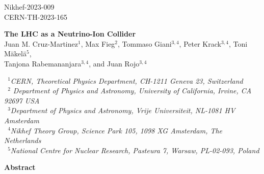 \documentclass[11pt,a4paper]{article}
\numberwithin{equation}{section}
\numberwithin{figure}{section}
\numberwithin{table}{section}
\begin{document}

\vspace{-2.0cm}
\begin{flushright}
Nikhef-2023-009 \\ CERN-TH-2023-165\\
\end{flushright}
\vspace{0.6cm}

\begin{center}
  {\Large \bf The LHC as a Neutrino-Ion Collider}\\
  \vspace{1.1cm}
  {\small
    Juan M. Cruz-Martinez$^{1}$, Max Fieg$^{2}$, Tommaso Giani$^{3,4}$, Peter Krack$^{3,4}$, Toni M\"akel\"a$^{5}$,  \\[0.1cm]
    Tanjona Rabemananjara$^{3,4}$, and Juan Rojo$^{3,4}$
  }\\
  
\vspace{0.7cm}

{\it \small
    ~$^1$CERN, Theoretical Physics Department, CH-1211 Geneva 23, Switzerland \\[0.1cm]
    ~$^2$ Department of Physics and Astronomy, University of California, Irvine, CA 92697 USA  \\[0.1cm]
    ~$^3$Department of Physics and Astronomy, Vrije Universiteit, NL-1081 HV Amsterdam\\[0.1cm]
    ~$^4$Nikhef Theory Group, Science Park 105, 1098 XG Amsterdam, The Netherlands\\[0.1cm]
    ~$^5$National Centre for Nuclear Research, Pasteura 7, Warsaw, PL-02-093, Poland \\[0.1cm]
 }

\vspace{1.0cm}

{\bf \large Abstract}

\end{center}
\end{document}
